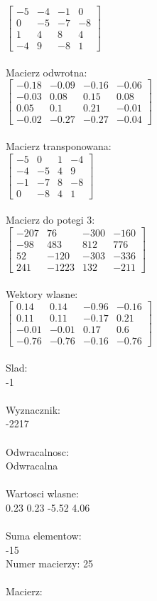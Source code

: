 \documentclass[a4paper,12pt]{article}
\begin{document}
$\begin{bmatrix} -5&-4&-1&0\\0&-5&-7&-8\\1&4&8&4\\-4&9&-8&1 \end{bmatrix}$
\\
\\
Macierz odwrotna:\\

$\begin{bmatrix} -0.18&-0.09&-0.16&-0.06\\-0.03&0.08&0.15&0.08\\0.05&0.1&0.21&-0.01\\-0.02&-0.27&-0.27&-0.04 \end{bmatrix}$
\\
\\
Macierz transponowana:\\

$\begin{bmatrix} -5&0&1&-4\\-4&-5&4&9\\-1&-7&8&-8\\0&-8&4&1 \end{bmatrix}$
\\
\\
Macierz do potegi 3:\\

$\begin{bmatrix} -207&76&-300&-160\\-98&483&812&776\\52&-120&-303&-336\\241&-1223&132&-211 \end{bmatrix}$
\\
\\
Wektory wlasne:\\

$\begin{bmatrix} 0.14&0.14&-0.96&-0.16\\0.11&0.11&-0.17&0.21\\-0.01&-0.01&0.17&0.6\\-0.76&-0.76&-0.16&-0.76 \end{bmatrix}$
\\
\\
Slad:\\
-1
\\
\\
Wyznacznik:\\
-2217
\\
\\
Odwracalnosc:\\
Odwracalna
\\
\\
Wartosci wlasne:\\
0.23 0.23 -5.52 4.06
\\
\\
Suma elementow:\\
-15
\\
\newpage
Numer macierzy:
25
\\
\\
Macierz:\\
\end{document}
